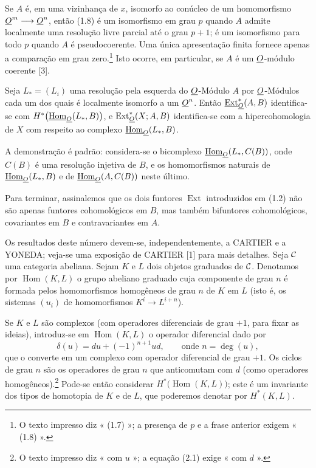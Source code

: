  Se $A$ é, em uma vizinhança de $x$, isomorfo ao
conúcleo de um homomorfismo $\underline{O}^{m}\longrightarrow\underline{O}^{n}$, então (1.8) é um isomorfismo em grau $p$ quando $A$ admite localmente uma resolução livre parcial até o grau $p+1$; é um isomorfismo para todo $p$ quando $A$ é pseudocoerente. Uma única apresentação finita fornece apenas a comparação em grau zero.\footnote{O texto impresso diz « (1.7) »; a
presença de $p$ e a frase anterior exigem « (1.8) ».} Isto ocorre, em
particular, se $A$ é um $\underline{O}$-módulo coerente [3].

 Seja $L_{*}=(L_i)$ uma resolução pela esquerda do
$\underline{O}$-Módulo $A$ por $\underline{O}$-Módulos cada um dos quais é localmente isomorfo a
um $\underline{O}^{n}$. Então $\underline{\operatorname{Ext}}_{\underline{O}}^{*}(A,B)$ identifica-se com
$H^{*}\bigl(\underline{\operatorname{Hom}}_{\underline{O}}(L_{*},B)\bigr)$, e
$\operatorname{Ext}_{\underline{O}}^{*}(X;A,B)$ identifica-se com a hipercohomologia de $X$
com respeito ao complexo $\underline{\operatorname{Hom}}_{\underline{O}}(L_{*},B)$.

A demonstração é padrão: considera-se o bicomplexo
$\underline{\operatorname{Hom}}_{\underline{O}}(L_{*},C(B))$, onde $C(B)$ é uma resolução injetiva de $B$, e os
homomorfismos naturais de $\underline{\operatorname{Hom}}_{\underline{O}}(L_{*},B)$ e de
$\underline{\operatorname{Hom}}_{\underline{O}}(A,C(B))$ neste último.

Para terminar, assinalemos que os dois funtores $\operatorname{Ext}$ introduzidos
em (1.2) não são apenas funtores cohomológicos em $B$, mas também
bifuntores cohomológicos, covariantes em $B$ e contravariantes em $A$.


Os resultados deste número devem-se, independentemente, a CARTIER e a YONEDA; veja-se
uma exposição de CARTIER [1] para mais detalhes. Seja $\mathcal C$ uma categoria abeliana.
Sejam $K$ e $L$ dois objetos graduados de $\mathcal C$. Denotamos por
$\operatorname{Hom}(K,L)$ o grupo abeliano graduado cuja componente de grau
$n$ é formada pelos homomorfismos homogêneos de grau $n$ de $K$ em $L$ (isto é,
os sistemas $(u_i)$ de homomorfismos $K^{i}\longrightarrow L^{i+n}$).

Se $K$ e $L$ são complexos (com operadores diferenciais de grau $+1$, para
fixar as ideias), introduz-se em $\operatorname{Hom}(K,L)$ o operador
diferencial dado por
\begin{equation}\tag{2.1}
  \delta(u)=du+(-1)^{n+1}ud,\qquad\text{onde }n=\deg(u),
\end{equation}
que o converte em um complexo com operador diferencial de grau $+1$. Os ciclos de
grau $n$ são os operadores de grau $n$ que anticomutam com $d$ (como
operadores homogêneos).\footnote{O texto impresso diz « com $u$ »; a equação
(2.1) exige « com $d$ ».} Pode-se então considerar
$H^{*}\bigl(\operatorname{Hom}(K,L)\bigr)$; este é um invariante dos tipos
de homotopia de $K$ e de $L$, que poderemos denotar por $H^{*}(K,L)$.

